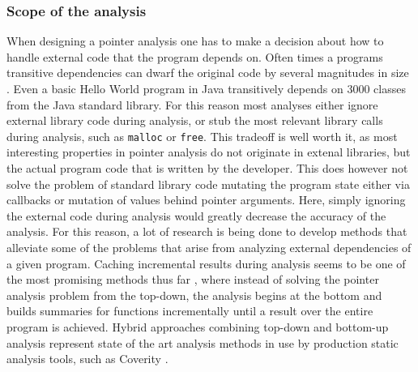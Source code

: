 \subsubsection{Scope of the analysis}
When designing a pointer analysis one has to make a decision about how to handle external code that the program depends on.
Often times a programs transitive dependencies can dwarf the original code by several magnitudes in size \cite{toman2017taming}.
Even a basic Hello World program in Java transitively depends on 3000 classes \cite{kulkarni2016accelerating} from the Java standard library.
For this reason most analyses either ignore external library code during analysis, or stub the most relevant library calls during analysis, such as \verb|malloc| or \verb|free|.
This tradeoff is well worth it, as most interesting properties in pointer analysis do not originate in extenal libraries, but the actual program code that is written by the developer.
This does however not solve the problem of standard library code mutating the program state either via callbacks or mutation of values behind pointer arguments. Here, simply ignoring the external code during analysis would greatly decrease the accuracy of the analysis.
For this reason, a lot of research is being done to develop methods that alleviate some of the problems that arise from analyzing external dependencies of a given program. Caching incremental results during analysis seems to be one of the most promising methods thus far \cite{mcpeak2013scalable}, where instead of solving the pointer analysis problem from the top-down, the analysis begins at the bottom and builds summaries for functions incrementally until a result over the entire program is achieved. Hybrid approaches combining top-down and bottom-up analysis represent state of the art analysis methods in use by production static analysis tools, such as Coverity \cite{mcpeak2013scalable}.

